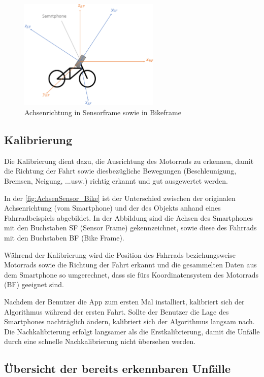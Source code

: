 \begin{figure}[htpb]
	\centering
	\includegraphics[width=0.6\textwidth]{Bilder/AchsenSensor_Bike_new_.pdf} 
	\caption{Achsenrichtung in Sensorframe sowie in Bikeframe}
	\label{fig:AchsenSensor_Bike}
\end{figure}
\subsection{Kalibrierung}
Die Kalibrierung dient dazu, die Ausrichtung des Motorrads zu erkennen, damit die Richtung der Fahrt sowie diesbezügliche Bewegungen (Beschleunigung, Bremsen, Neigung, ...usw.) richtig erkannt und gut ausgewertet werden.

In der \autoref{fig:AchsenSensor_Bike} ist der Unterschied zwischen der originalen Achsenrichtung (vom Smartphone) und der des Objekts anhand eines Fahrradbeispiels abgebildet. In der Abbildung sind die Achsen des Smartphones mit den Buchstaben \glqq SF\grqq{} (Sensor Frame) gekennzeichnet, sowie diese des Fahrrads mit den Buchstaben \glqq BF\grqq{} (Bike Frame).

Während der Kalibrierung wird die Position des Fahrrads beziehungsweise Motorrads sowie die Richtung der Fahrt erkannt und die gesammelten Daten aus dem Smartphone so umgerechnet, dass sie fürs Koordinatensystem des Motorrads (BF) geeignet sind.

Nachdem der Benutzer die App zum ersten Mal installiert, kalibriert sich der Algorithmus während der ersten Fahrt. Sollte der Benutzer die Lage des Smartphones nachträglich ändern, kalibriert sich der Algorithmus langsam nach. Die Nachkalibrierung erfolgt langsamer als die Erstkalibrierung, damit die Unfälle durch eine schnelle Nachkalibrierung nicht übersehen werden.



\subsection{Übersicht der bereits erkennbaren Unfälle}

